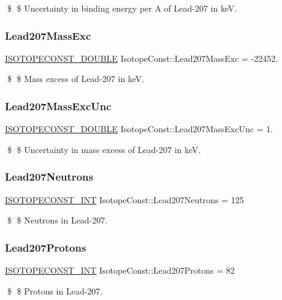 \$ \$ Uncertainty in binding energy per A of Lead-\/207 in keV. \mbox{\label{group___isotope_const-_lead-_pb207_ga26d699f0c79eed0f554f0b861125cd88}} 
\subsubsection{\texorpdfstring{Lead207\+Mass\+Exc}{Lead207MassExc}}
{\footnotesize\ttfamily \mbox{\hyperlink{group___isotope_const-_macros_ga8f45a7272ce02c0b4c65c44636ed719a}{I\+S\+O\+T\+O\+P\+E\+C\+O\+N\+S\+T\+\_\+\+D\+O\+U\+B\+LE}} Isotope\+Const\+::\+Lead207\+Mass\+Exc = -\/22452.}

\$ \$ Mass excess of Lead-\/207 in keV. \mbox{\label{group___isotope_const-_lead-_pb207_gae2a7c341ca581b9cef1d32eec5c5620d}} 
\subsubsection{\texorpdfstring{Lead207\+Mass\+Exc\+Unc}{Lead207MassExcUnc}}
{\footnotesize\ttfamily \mbox{\hyperlink{group___isotope_const-_macros_ga8f45a7272ce02c0b4c65c44636ed719a}{I\+S\+O\+T\+O\+P\+E\+C\+O\+N\+S\+T\+\_\+\+D\+O\+U\+B\+LE}} Isotope\+Const\+::\+Lead207\+Mass\+Exc\+Unc = 1.}

\$ \$ Uncertainty in mass excess of Lead-\/207 in keV. \mbox{\label{group___isotope_const-_lead-_pb207_ga8f4d5a27a8f63c462d477b65f9970e6c}} 
\subsubsection{\texorpdfstring{Lead207\+Neutrons}{Lead207Neutrons}}
{\footnotesize\ttfamily \mbox{\hyperlink{group___isotope_const-_macros_ga5f18360b3e99483a35c32d789e62621c}{I\+S\+O\+T\+O\+P\+E\+C\+O\+N\+S\+T\+\_\+\+I\+NT}} Isotope\+Const\+::\+Lead207\+Neutrons = 125}

\$ \$ Neutrons in Lead-\/207. \mbox{\label{group___isotope_const-_lead-_pb207_ga6632a095e87181bbc092572f9b38ac13}} 
\subsubsection{\texorpdfstring{Lead207\+Protons}{Lead207Protons}}
{\footnotesize\ttfamily \mbox{\hyperlink{group___isotope_const-_macros_ga5f18360b3e99483a35c32d789e62621c}{I\+S\+O\+T\+O\+P\+E\+C\+O\+N\+S\+T\+\_\+\+I\+NT}} Isotope\+Const\+::\+Lead207\+Protons = 82}

\$ \$ Protons in Lead-\/207. 
